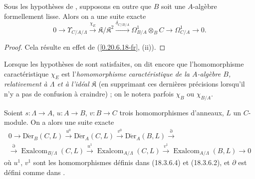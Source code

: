 \begin{corollary}[20.6.23]
\label{0.20.6.23-fr}
Sous les hypothèses de \textup{}, supposons en outre que $B$ soit
une $A$-algèbre formellement lisse. Alors on a une suite exacte
\begin{equation}
\tag{20.6.23.1}
\label{0.20.6.23.1-fr}
  0\to\Upsilon_{C/A/\Lambda}\xrightarrow{\chi_E}
  \mathfrak{K}/\mathfrak{K}^2\xrightarrow{\delta_{C/B/A}}
  \Omega^1_{B/A}\otimes_B C\to\Omega^1_{C/A}\to0.
\end{equation}
\end{corollary}

\begin{proof}
Cela résulte en effet de (\ref{0.20.6.18-fr}, (ii)).
\end{proof}

\begin{env}[20.6.24]
\label{0.20.6.24-fr}
Lorsque les hypothèses de  sont satisfaites, on dit encore
que l'homomorphisme caractéristique $\chi_E$ est
l'\emph{homomorphisme caractéristique de la $A$-algèbre $B$, relativement à
$\Lambda$ et à l'idéal $\mathfrak{K}$} (en supprimant ces dernières
précisions lorsqu'il n'y a pas de confusion à craindre) ; on le notera
parfois $\chi_B$ ou $\chi_{B/A}$.
\end{env}

\begin{proposition}[20.6.25]
\label{0.20.6.25-fr}
Soient $s:\Lambda\to A$, $u:A\to B$, $v:B\to C$ trois homomorphismes
d'anneaux, $L$ un $C$-module. On a alors une suite exacte
\begin{equation}
\tag{20.6.25.1}
\label{0.20.6.25.1-fr}
\begin{split}
  0\to\operatorname{D\acute{e}r}_B(C,L)\xrightarrow{u^0}
  \operatorname{D\acute{e}r}_A(C,L)\xrightarrow{v^0}
  \operatorname{D\acute{e}r}_A(B,L)\xrightarrow{\partial} \\
  \xrightarrow{\partial}\operatorname{Exalcom}_{B/\Lambda}(C,L)\xrightarrow{u^1}
  \operatorname{Exalcom}_{A/\Lambda}(C,L)\xrightarrow{v^1}
  \operatorname{Exalcom}_{A/\Lambda}(B,L)\to0
\end{split}
\end{equation}
où $u^1$, $v^1$ sont les homomorphismes définis dans \textup{(18.3.6.4)} et
\textup{(18.3.6.2)}, et $\partial$ est défini comme dans \textup{}.
\end{proposition}

